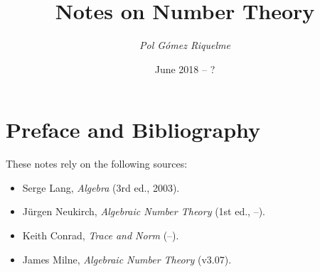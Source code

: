 \documentclass[12pt,oneside]{article}
\begin{document}
\title{Notes on Number Theory}
\author{\small\textit{Pol Gómez Riquelme}}
\date{June 2018 -- ?}
\maketitle

\tableofcontents
\pagebreak

\section*{Preface and Bibliography}

These notes rely on the following sources:
\begin{itemize}
	\item Serge Lang, \emph{Algebra} (3rd ed., 2003).
	\item Jürgen Neukirch, \emph{Algebraic Number Theory} (1st ed., --).
	\item Keith Conrad, \emph{Trace and Norm} (--).
	\item James Milne, \emph{Algebraic Number Theory} (v3.07).
\end{itemize}

\pagebreak




\end{document}
